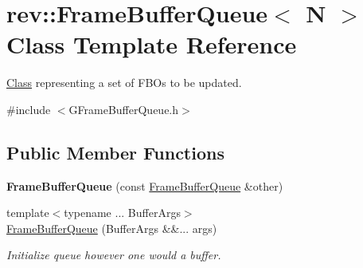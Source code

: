 \hypertarget{classrev_1_1_frame_buffer_queue}{}\section{rev\+::Frame\+Buffer\+Queue$<$ N $>$ Class Template Reference}
\label{classrev_1_1_frame_buffer_queue}


\mbox{\hyperlink{struct_class}{Class}} representing a set of F\+B\+Os to be updated.  




{\ttfamily \#include $<$G\+Frame\+Buffer\+Queue.\+h$>$}

\subsection*{Public Member Functions}
\begin{DoxyCompactItemize}
\item 
\mbox{\label{classrev_1_1_frame_buffer_queue_a0b59b9c571c7cc92fe3b28367c8782ef}} 
{\bfseries Frame\+Buffer\+Queue} (const \mbox{\hyperlink{classrev_1_1_frame_buffer_queue}{Frame\+Buffer\+Queue}} \&other)
\item 
{\footnotesize template$<$typename ... Buffer\+Args$>$ }\\\mbox{\hyperlink{classrev_1_1_frame_buffer_queue_ad4427af30c73241dcf61d9a6f8adff3e}{Frame\+Buffer\+Queue}} (Buffer\+Args \&\&... args)
\begin{DoxyCompactList}\small\item\em Initialize queue however one would a buffer. \end{DoxyCompactList}\end{DoxyCompactItemize}

